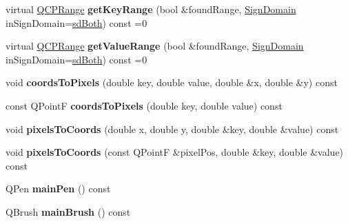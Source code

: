 \begin{DoxyCompactItemize}
virtual \mbox{\hyperlink{class_q_c_p_range}{Q\+C\+P\+Range}} {\bfseries get\+Key\+Range} (bool \&found\+Range, \mbox{\hyperlink{class_q_c_p_abstract_plottable_a661743478a1d3c09d28ec2711d7653d8}{Sign\+Domain}} in\+Sign\+Domain=\mbox{\hyperlink{class_q_c_p_abstract_plottable_a661743478a1d3c09d28ec2711d7653d8a082b98cfb91a7363a3b5cd17b0c1cd60}{sd\+Both}}) const =0
\item 
\mbox{\label{class_q_c_p_abstract_plottable_aa3331b415b5939fe4df60b78831b2799}} 
virtual \mbox{\hyperlink{class_q_c_p_range}{Q\+C\+P\+Range}} {\bfseries get\+Value\+Range} (bool \&found\+Range, \mbox{\hyperlink{class_q_c_p_abstract_plottable_a661743478a1d3c09d28ec2711d7653d8}{Sign\+Domain}} in\+Sign\+Domain=\mbox{\hyperlink{class_q_c_p_abstract_plottable_a661743478a1d3c09d28ec2711d7653d8a082b98cfb91a7363a3b5cd17b0c1cd60}{sd\+Both}}) const =0
\item 
\mbox{\label{class_q_c_p_abstract_plottable_a7ad84a36472441cf1f555c5683d0da93}} 
void {\bfseries coords\+To\+Pixels} (double key, double value, double \&x, double \&y) const
\item 
\mbox{\label{class_q_c_p_abstract_plottable_a5acb50ae984eef09a7ab92315d2ad708}} 
const Q\+PointF {\bfseries coords\+To\+Pixels} (double key, double value) const
\item 
\mbox{\label{class_q_c_p_abstract_plottable_a3903c1120ab5c27e7fa46b597ef267bd}} 
void {\bfseries pixels\+To\+Coords} (double x, double y, double \&key, double \&value) const
\item 
\mbox{\label{class_q_c_p_abstract_plottable_a28d32c0062b9450847851ffdee1c5f69}} 
void {\bfseries pixels\+To\+Coords} (const Q\+PointF \&pixel\+Pos, double \&key, double \&value) const
\item 
\mbox{\label{class_q_c_p_abstract_plottable_abd790a3b229239f49067f136633a4b98}} 
Q\+Pen {\bfseries main\+Pen} () const
\item 
\mbox{\label{class_q_c_p_abstract_plottable_ac9147022a662e92b46c39e7cb821b0af}} 
Q\+Brush {\bfseries main\+Brush} () const

\end{DoxyCompactItemize}
